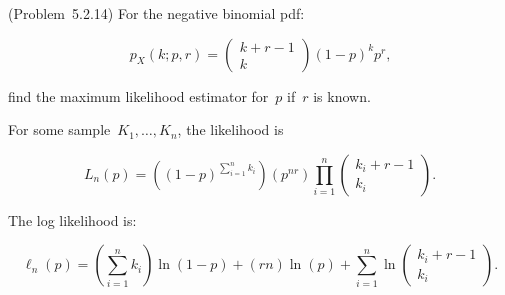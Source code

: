 \begin{problem}
  (\textnormal{Problem~5.2.14}) For the negative binomial pdf:

  \begin{equation}\label{eq:P07}
    p_{X}(k;p,r) =  \left(%
                      \begin{array}{c}
                        k + r - 1 \\
                        k
                      \end{array}
                    \right) (1-p)^{k} p^{r}\text{,}
  \end{equation}

  \noindent
  find the maximum likelihood estimator for~$p$ if~$r$ is known.
\end{problem}

For some sample~${K_1,\ldots,K_n}$, the likelihood is

\begin{equation}\label{eq:P07:Likelihood}
  L_n(p) = \left(\left(1-p\right)^{\sum_{i=1}^n k_i}\right) \left(p^{nr}\right) \prod_{i=1}^{n} \left(%
                                                                            \begin{array}{c}
                                                                              k_i + r - 1 \\
                                                                              k_i
                                                                            \end{array}
                                                                     \right)\text{.}
\end{equation}

\noindent
The log likelihood is:

\begin{equation}
  \ell_n(p) = \left(\sum_{i=1}^{n} k_i\right) \ln(1 - p) + (rn) \ln (p) + \sum_{i=1}^{n} \ln \left(%
                                                                                                 \begin{array}{c}
                                                                                                   k_i + r - 1 \\
                                                                                                   k_i
                                                                                                 \end{array}
                                                                                               \right)\text{.}
\end{equation}

